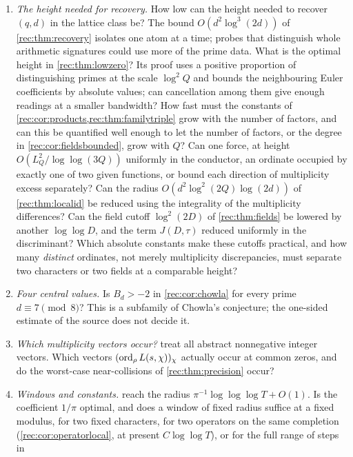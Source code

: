 \begin{enumerate}
\item \emph{The height needed for recovery.} How low can the height needed to recover $(q,d)$ in the
lattice class be? The bound $O(d^2\log^3(2d))$ of \cref{rec:thm:recovery} isolates one atom at a time;
probes that distinguish whole arithmetic signatures could use more of the prime data. What is the
optimal height in \cref{rec:thm:lowzero}? Its proof uses a positive proportion of distinguishing
primes at the scale $\log^2Q$ and bounds the neighbouring Euler coefficients by absolute values; can
cancellation among them give enough readings at a smaller bandwidth? How fast must the constants of
\cref{rec:cor:products,rec:thm:familytriple} grow with the number of factors, and can this be quantified well
enough to let the number of factors, or the degree in \cref{rec:cor:fieldsbounded}, grow with $Q$? Can one force, at height
$O(L_Q^2/\log\log(3Q))$ uniformly in the conductor, an ordinate occupied by exactly one of two given
functions, or bound each direction of multiplicity excess separately? Can the radius
$O(d^2\log^2(2Q)\log(2d))$ of \cref{rec:thm:localid} be reduced using the integrality of the multiplicity
differences? Can the field cutoff $\log^2(2D)$ of \cref{rec:thm:fields} be lowered by another $\log\log D$,
and the term $J(D,\tau)$ reduced uniformly in the discriminant? Which absolute constants make these
cutoffs practical, and how many \emph{distinct} ordinates, not merely multiplicity discrepancies, must
separate two characters or two fields at a comparable height?
\item \emph{Four central values.} Is $B_d>-2$ in \cref{rec:cor:chowla} for every prime
$d\equiv7\pmod8$? This is a subfamily of Chowla's conjecture; the one-sided estimate of the source
does not decide it.
\item \emph{Which multiplicity vectors occur?} 
treat all abstract nonnegative integer vectors. Which vectors $(\operatorname{ord}_\rho L(s,\chi))_\chi$ actually occur
at common zeros, and do the worst-case near-collisions of \cref{rec:thm:precision} occur?
\item \emph{Windows and constants.}  reach the
radius $\pi^{-1}\log\log\log T+O(1)$. Is the coefficient $1/\pi$ optimal, and does a window of fixed radius
suffice at a fixed modulus, for two fixed characters, for two operators on the same completion
(\cref{rec:cor:operatorlocal}, at present $C\log\log T$), or for the full range of steps in

\end{enumerate}

